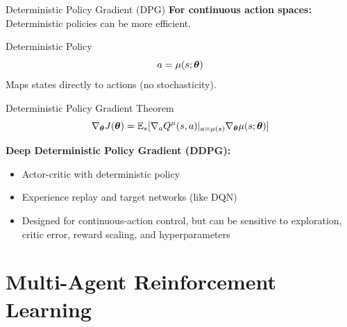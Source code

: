 \documentclass[aspectratio=169]{beamer}
\begin{document}
\begin{frame}{Deterministic Policy Gradient (DPG)}
  \textbf{For continuous action spaces:} Deterministic policies can be more efficient.

  \vspace{0.5em}

  \begin{definitionbox}{Deterministic Policy}
    $$a = \mu(s;\boldsymbol{\theta})$$
    Maps states directly to actions (no stochasticity).
  \end{definitionbox}

  \vspace{0.5em}

  \begin{theorembox}{Deterministic Policy Gradient Theorem}
    $$\nabla_{\boldsymbol{\theta}} J(\boldsymbol{\theta}) = \mathbb{E}_s[\nabla_a Q^\mu(s,a)|_{a=\mu(s)} \nabla_{\boldsymbol{\theta}} \mu(s;\boldsymbol{\theta})]$$
  \end{theorembox}

  \vspace{0.5em}

  \textbf{Deep Deterministic Policy Gradient (DDPG):}
  \begin{itemize}
    \item Actor-critic with deterministic policy
    \item Experience replay and target networks (like DQN)
    \item Designed for continuous-action control, but can be sensitive to exploration, critic error, reward scaling, and hyperparameters
  \end{itemize}
\end{frame}

\section{Multi-Agent Reinforcement Learning}
\end{document}

